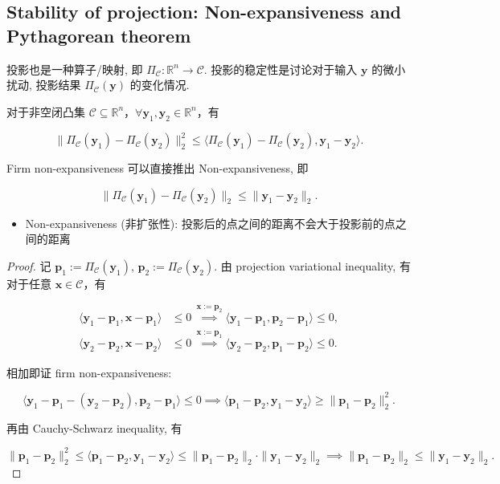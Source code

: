 \subsection{Stability of projection: Non-expansiveness and Pythagorean theorem}

投影也是一种算子/映射, 即 $\Pi_{\mathcal{C}}: \mathbb{R}^n \to \mathcal{C}$. 投影的稳定性是讨论对于输入 $\bm{y}$ 的微小扰动, 投影结果 $\Pi_{\mathcal{C}}(\bm{y})$ 的变化情况.


\begin{thmblock}
对于非空闭凸集 $\mathcal{C} \subseteq \mathbb{R}^n$，$\forall \bm{y}_1, \bm{y}_2 \in \mathbb{R}^n$，有

\[
\|\Pi_{\mathcal{C}}(\bm{y}_1) - \Pi_{\mathcal{C}}(\bm{y}_2)\|_2^2 \leq 
\langle \Pi_{\mathcal{C}}(\bm{y}_1) - \Pi_{\mathcal{C}}(\bm{y}_2), \bm{y}_1 - \bm{y}_2 \rangle.
\]

Firm non-expansiveness 可以直接推出 Non-expansiveness, 即

\[
\|\Pi_{\mathcal{C}}(\bm{y}_1) - \Pi_{\mathcal{C}}(\bm{y}_2)\|_2 \leq \|\bm{y}_1 - \bm{y}_2\|_2.
\]

\begin{itemize}
\item {}Non-expansiveness (非扩张性): 投影后的点之间的距离不会大于投影前的点之间的距离


\end{itemize}


\begin{proof}{}
记 $\bm{p}_1 := \Pi_{\mathcal{C}}(\bm{y}_1)$, $\bm{p}_2 := \Pi_{\mathcal{C}}(\bm{y}_2)$. 由 projection variational inequality, 有对于任意 $\bm{x} \in \mathcal{C}$，有

\[
\begin{aligned}
\langle \bm{y}_1 - \bm{p}_1, \bm{x} - \bm{p}_1 \rangle &\leq 0\,\stackrel{\bm{x}:= \bm{p}_2}{\implies} \langle \bm{y}_1 - \bm{p}_1, \bm{p}_2 - \bm{p}_1 \rangle \leq 0,\\
\langle \bm{y}_2 - \bm{p}_2, \bm{x} - \bm{p}_2 \rangle &\leq 0\,\stackrel{\bm{x}:= \bm{p}_1}{\implies} \langle \bm{y}_2 - \bm{p}_2, \bm{p}_1 - \bm{p}_2 \rangle \leq 0.
\end{aligned}
\]

相加即证 firm non-expansiveness:

\[
\langle \bm{y}_1 - \bm{p}_1 - (\bm{y}_2 - \bm{p}_2), \bm{p}_2 - \bm{p}_1 \rangle \leq 0 \implies \langle \bm{p}_1 - \bm{p}_2, \bm{y}_1 - \bm{y}_2 \rangle \geq \|\bm{p}_1 - \bm{p}_2\|_2^2.
\]

再由 Cauchy-Schwarz inequality, 有

\[
\|\bm{p}_1 - \bm{p}_2\|_2^2 \leq \langle \bm{p}_1 - \bm{p}_2, \bm{y}_1 - \bm{y}_2 \rangle \leq \|\bm{p}_1 - \bm{p}_2\|_2 \cdot \|\bm{y}_1 - \bm{y}_2\|_2 \implies \|\bm{p}_1 - \bm{p}_2\|_2 \leq \|\bm{y}_1 - \bm{y}_2\|_2.
\]

\end{proof}

\end{thmblock}


